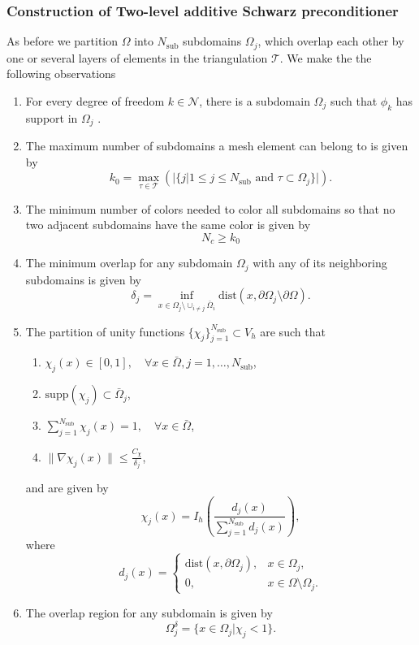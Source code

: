 \subsubsection{Construction of Two-level additive Schwarz preconditioner}
As before we partition $\Omega$ into $N_{\text{sub}}$ subdomains $\Omega_j$, which overlap each other by one or several layers of elements in the triangulation $\mathcal{T}$. We make the the following observations
\begin{enumerate}[label=\textbf{D\arabic*}, ref=\textbf{D\arabic*}]
    \item\label{ASM_observation:basis_inclusion} For every degree of freedom $k\in\mathcal{N}$, there is a subdomain $\Omega_j$ such that $\phi_k$ has support in $\Omega_j$ \cite[Lemma 5.3]{schwarz_methods_Dolean_2015}.
    \item\label{ASM_observation:multiplicity_of_intersections} The maximum number of subdomains a mesh element can belong to is given by
    \[
        k_0 = \max_{\tau\in\mathcal{T}} \left (|\{j|1\leq j\leq N_{\text{sub}} \text{ and } \tau \subset \Omega_j\}| \right).
    \]
    \item\label{ASM_observation:number_of_colors} The minimum number of colors needed to color all subdomains so that no two adjacent subdomains have the same color is given by
    \[
        N_c \geq k_0
    \]
    \item\label{ASM_observation:overlapping_parameter} The minimum overlap for any subdomain $\Omega_j$ with any of its neighboring subdomains is given by
    \[
        \delta_j = \inf_{x\in\Omega_j\setminus\cup_{i\neq j} \bar{\Omega}_i} \text{dist}(x, \partial \Omega_j\setminus\partial \Omega).
    \]
    \item\label{ASM_observation:partition_of_unity} The partition of unity functions $\{\chi_j\}_{j=1}^{N_{\text{sub}}}\subset V_h$ are such that
    \begin{enumerate}[label*=.\alph*]
        \item $\chi_j(x) \in [0,1], \quad \forall x\in\bar{\Omega}, j=1,\ldots,N_{\text{sub}}$,
        \item $\text{supp}(\chi_j) \subset \bar{\Omega}_j$,
        \item $\sum_{j=1}^{N_{\text{sub}}} \chi_j(x) = 1, \quad \forall x\in\bar{\Omega}$,
        \item $\|\nabla\chi_j(x)\| \leq \frac{C_{\chi}}{\delta_j}$,
    \end{enumerate}
    and are given by
    \[
        \chi_j(x) = I_h\left(\frac{d_j(x)}{\sum_{j=1}^{N_{\text{sub}}} d_j(x)}\right),
    \]
    where
    \[ 
        d_j(x) = 
            \begin{cases}
                \text{dist}(x, \partial \Omega_j), & x\in\Omega_j, \\
                0, & x\in\Omega\setminus\Omega_j.
            \end{cases}
    \]
    \item\label{ASM_observation:overlap_region} The overlap region for any subdomain is given by 
    \[
        \Omega_j^{\delta} = \{x\in\Omega_j| \chi_j < 1\}.
    \]
\end{enumerate}
